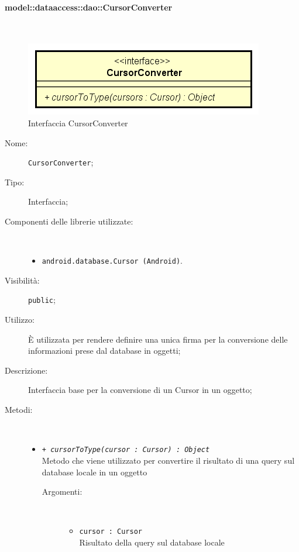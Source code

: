 \documentclass[../DefinizioneDiProdotto.tex]{subfiles}
\begin{document}
\paragraph{model::dataaccess::dao::CursorConverter}
\
\begin{figure}[H]
	\centering
	\includegraphics[width=\maxwidth]{img/CursorConverter.png}
	\caption{Interfaccia CursorConverter}\label{fig:model::dataaccess::dao::CursorConverter} 
\end{figure}
\begin{description}
	\item[Nome:] \texttt{CursorConverter};
	\item[Tipo:] Interfaccia;
	\item[Componenti delle librerie utilizzate:] \
	\begin{itemize}
		\item \texttt{android.database.Cursor (Android)}.
		
	\end{itemize}
	\item[Visibilità:] \texttt{public};
	\item[Utilizzo:] È utilizzata per rendere definire una unica firma per la conversione delle informazioni prese dal database in oggetti;
	\item[Descrizione:] Interfaccia base per la conversione di un Cursor in un oggetto;
	\item[Metodi:] \
	\begin{itemize}
		\item \texttt{+ \textit{cursorToType(cursor : Cursor) : Object}}\\
		Metodo che viene utilizzato per convertire il risultato di una query sul database locale in un oggetto
		\begin{description}
			\item[Argomenti:] \
			\begin{itemize}
				\item \texttt{cursor : Cursor}\\
				Risultato della query sul database locale\end{itemize}
		\end{description}
	\end{itemize}
\end{description}
\end{document}
